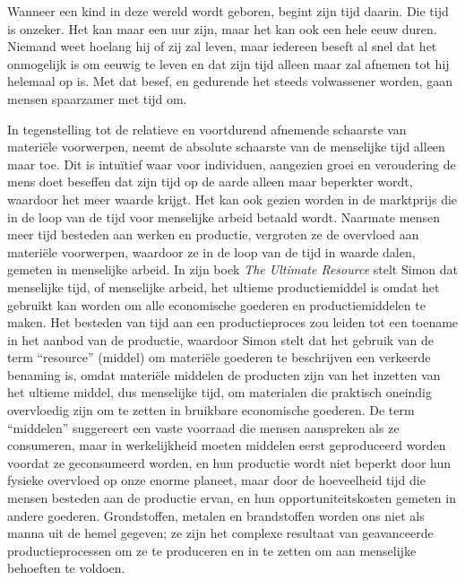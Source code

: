 Wanneer een kind in deze wereld wordt geboren, begint zijn tijd daarin. Die tijd is onzeker. Het kan maar een uur zijn, maar het kan ook een hele eeuw duren. Niemand weet hoelang hij of zij zal leven, maar iedereen beseft al snel dat het onmogelijk is om eeuwig te leven en dat zijn tijd alleen maar zal afnemen tot hij helemaal op is. Met dat besef, en gedurende het steeds volwassener worden, gaan mensen spaarzamer met tijd om.

In tegenstelling tot de relatieve en voortdurend afnemende schaarste van
materiële voorwerpen, neemt de absolute schaarste van de menselijke tijd
alleen maar toe. Dit is intuïtief waar voor individuen, aangezien groei
en veroudering de mens doet beseffen dat zijn tijd op de aarde alleen
maar beperkter wordt, waardoor het meer waarde krijgt. Het kan ook
gezien worden in de marktprijs die in de loop van de tijd voor
menselijke arbeid betaald wordt. Naarmate mensen meer tijd besteden aan
werken en productie, vergroten ze de overvloed aan materiële voorwerpen,
waardoor ze in de loop van de tijd in waarde dalen, gemeten in
menselijke arbeid. In zijn boek \textit{The
Ultimate Resource} stelt Simon dat menselijke tijd, of menselijke
arbeid, het ultieme productiemiddel is omdat het gebruikt kan worden om
alle economische goederen en productiemiddelen te maken.\autocite{26}
Het besteden van tijd aan een productieproces zou leiden tot een toename
in het aanbod van de productie, waardoor Simon stelt dat het gebruik van
de term ``resource'' (middel) om materiële goederen te beschrijven een
verkeerde benaming is, omdat materiële middelen de producten zijn van
het inzetten van het ultieme middel, dus menselijke tijd, om materialen
die praktisch oneindig overvloedig zijn om te zetten in bruikbare
economische goederen. De term ``middelen'' suggereert een vaste voorraad
die mensen aanspreken als ze consumeren, maar in werkelijkheid moeten
middelen eerst geproduceerd worden voordat ze geconsumeerd worden, en
hun productie wordt niet beperkt door hun fysieke overvloed op onze
enorme planeet, maar door de hoeveelheid tijd die mensen besteden aan de
productie ervan, en hun opportuniteitskosten gemeten in andere goederen.
Grondstoffen, metalen en brandstoffen worden ons niet als manna uit de
hemel gegeven; ze zijn het complexe resultaat van geavanceerde
productieprocessen om ze te produceren en in te zetten om aan menselijke
behoeften te voldoen.

